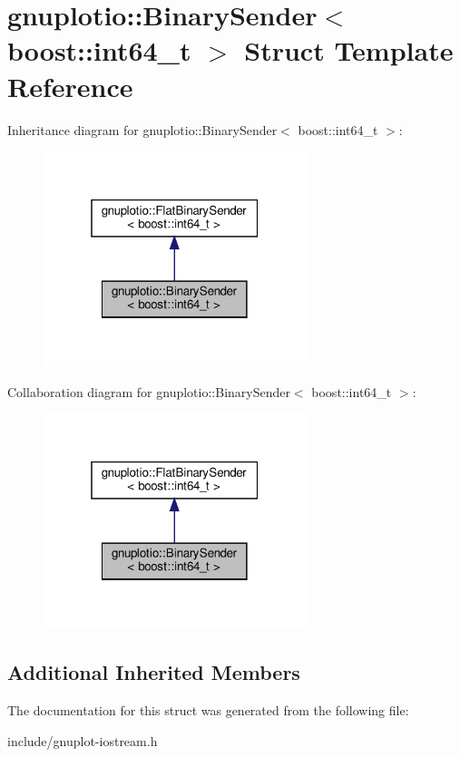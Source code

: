 \hypertarget{structgnuplotio_1_1BinarySender_3_01boost_1_1int64__t_01_4}{}\section{gnuplotio\+:\+:Binary\+Sender$<$ boost\+:\+:int64\+\_\+t $>$ Struct Template Reference}
\label{structgnuplotio_1_1BinarySender_3_01boost_1_1int64__t_01_4}


Inheritance diagram for gnuplotio\+:\+:Binary\+Sender$<$ boost\+:\+:int64\+\_\+t $>$\+:\nopagebreak
\begin{figure}[H]
\begin{center}
\leavevmode
\includegraphics[width=217pt]{structgnuplotio_1_1BinarySender_3_01boost_1_1int64__t_01_4__inherit__graph}
\end{center}
\end{figure}


Collaboration diagram for gnuplotio\+:\+:Binary\+Sender$<$ boost\+:\+:int64\+\_\+t $>$\+:\nopagebreak
\begin{figure}[H]
\begin{center}
\leavevmode
\includegraphics[width=217pt]{structgnuplotio_1_1BinarySender_3_01boost_1_1int64__t_01_4__coll__graph}
\end{center}
\end{figure}
\subsection*{Additional Inherited Members}


The documentation for this struct was generated from the following file\+:\begin{DoxyCompactItemize}
\item 
include/gnuplot-\/iostream.\+h\end{DoxyCompactItemize}
